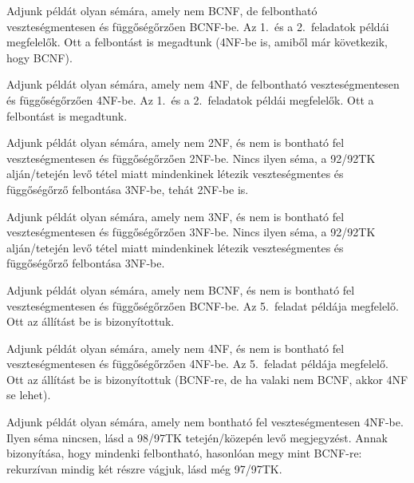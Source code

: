 \documentclass{article}
\begin{document}
Adjunk példát olyan sémára, amely nem BCNF, de felbontható veszteségmentesen
és függőségőrzően BCNF-be.
\megoldas Az 1.\ és a 2.\ feladatok példái megfelelők. Ott a felbontást is
megadtunk (4NF-be is, amiből már következik, hogy BCNF).

Adjunk példát olyan sémára, amely nem 4NF, de felbontható veszteségmentesen
és függőségőrzően 4NF-be.
\megoldas Az 1.\ és a 2.\ feladatok példái megfelelők. Ott a felbontást is
megadtunk.


Adjunk példát olyan sémára, amely nem 2NF, és nem is bontható fel
veszteségmentesen és függőségőrzően 2NF-be.
\megoldas Nincs ilyen séma, a 92/92TK alján/tetején levő tétel miatt mindenkinek
létezik veszteségmentes és függőségőrző felbontása 3NF-be, tehát 2NF-be is.

Adjunk példát olyan sémára, amely nem 3NF, és nem is bontható fel
veszteségmentesen és függőségőrzően 3NF-be.
\megoldas Nincs ilyen séma, a 92/92TK alján/tetején levő tétel miatt mindenkinek
létezik veszteségmentes és függőségőrző felbontása 3NF-be.

Adjunk példát olyan sémára, amely nem BCNF, és nem is bontható fel
veszteségmentesen és függőségőrzően BCNF-be.
\megoldas Az 5.\ feladat példája megfelelő. Ott az állítást be is
bizonyítottuk.

Adjunk példát olyan sémára, amely nem 4NF, és nem is bontható fel
veszteségmentesen és függőségőrzően 4NF-be.
\megoldas Az 5.\ feladat példája megfelelő. Ott az állítást be is
bizonyítottuk (BCNF-re, de ha valaki nem BCNF, akkor 4NF se lehet).

Adjunk példát olyan sémára, amely nem bontható fel veszteségmentesen 4NF-be.
\megoldas Ilyen séma nincsen, lásd a 98/97TK tetején/közepén levő megjegyzést. Annak
bizonyítása, hogy mindenki felbontható, hasonlóan megy mint BCNF-re:
rekurzívan mindig két részre vágjuk, lásd még 97/97TK.

\end{document}

